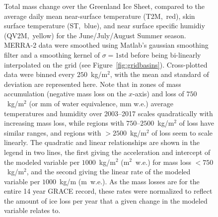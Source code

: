 \documentclass[11pt]{report}
\begin{document}
 \begin{figure}[h]
\centering
{}
\caption[Comparison of Total Mass Loss with T2M, ST, QV2M: 2003--2012]{Total mass change over the Greenland Ice Sheet, compared to the average daily mean near-surface temperature (T2M,~red), skin surface temperature (ST,~blue), and near surface specific humidiy (QV2M,~yellow) for the June/July/August Summer season. MERRA-2 data were smoothed using Matlab's gaussian smoothing filter and a smoothing kernel of $\sigma=1\mathrm{std}$ before being bi-linearly interpolated on the grid (see Figure~\ref{fig:gridbasins}). Cross-plotted data were binned every $250$~kg/m$^2$, with the mean and standard of deviation are represented here. Note that in zones of mass accumulation (negative mass loss on the $x$-axis) and loss of $750$~kg/m$^2$ (or mm of water equivalence, mm w.e.) average temperatures and humidity over 2003--2017 scales quadratically with increasing mass loss, while regions with $750$--$2500$~kg/m$^2$ of loss have similar ranges, and regions with $>2500$~kg/m$^2$ of loss seem to scale linearly. The quadratic and linear relationships are shown in the legend in two lines, the first giving the acceleration and intercept of the modeled variable per $1000$~kg/m$^2$ (m$^2$~w.e.) for mass loss $<750$~kg/m$^2$, and the second giving the linear rate of the modeled variable per $1000$~kg/m (m~w.e.). As the mass losses are for the entire 14 year GRACE record, these rates were normalized to reflect the amount of ice loss per year that a given change in the modeled variable relates to.
\label{fig:comparisontotal}}
\end{figure}
\end{document}

